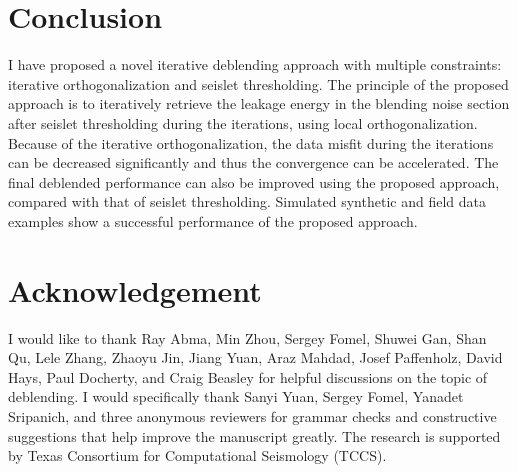 \section{Conclusion}
I have proposed a novel iterative deblending approach with multiple constraints: iterative orthogonalization and seislet thresholding. The principle of the proposed approach is to iteratively retrieve the leakage energy in the blending noise section after seislet thresholding during the iterations, using local orthogonalization. Because of the iterative orthogonalization, the data misfit during the iterations can be decreased significantly and thus the convergence can be accelerated. The final deblended performance can also be improved using the proposed approach, compared with that of seislet thresholding. Simulated synthetic and field data examples show a successful performance of the proposed approach. 

\section{Acknowledgement}
I would like to thank Ray Abma, Min Zhou, Sergey Fomel, Shuwei Gan, Shan Qu, Lele Zhang, Zhaoyu Jin, Jiang Yuan, Araz Mahdad, Josef Paffenholz, David Hays, Paul Docherty, and Craig Beasley for helpful discussions on the topic of deblending. I would specifically thank Sanyi Yuan, Sergey Fomel, Yanadet Sripanich, and three anonymous reviewers for grammar checks and constructive suggestions that help improve the manuscript greatly. The research is supported by Texas Consortium for Computational Seismology (TCCS). 



